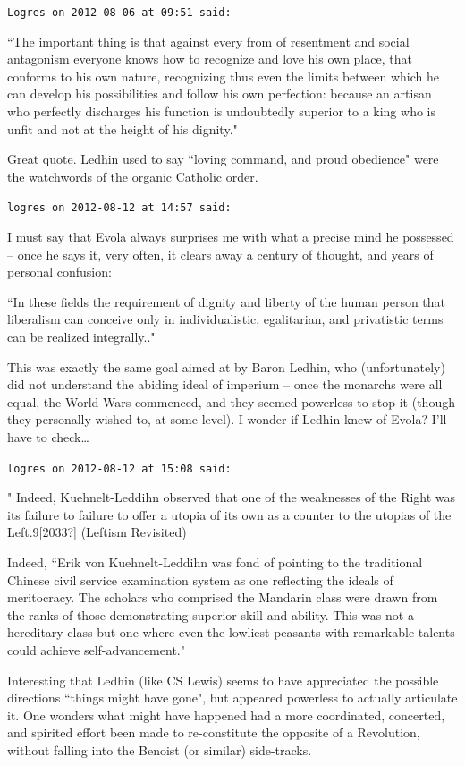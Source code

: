 \begin{footnotesize}
\begin{sffamily}
\hfill

\texttt{Logres on 2012-08-06 at 09:51 said: }

``The important thing is that against every from of resentment and social antagonism everyone knows how to recognize and love his own place, that conforms to his own nature, recognizing thus even the limits between which he can develop his possibilities and follow his own perfection: because an artisan who perfectly discharges his function is undoubtedly superior to a king who is unfit and not at the height of his dignity."

Great quote. Ledhin used to say ``loving command, and proud obedience" were the watchwords of the organic Catholic order.


\hfill

\texttt{logres on 2012-08-12 at 14:57 said: }

I must say that Evola always surprises me with what a precise mind he possessed – once he says it, very often, it clears away a century of thought, and years of personal confusion:

``In these fields the requirement of dignity and liberty of the human person that liberalism can conceive only in individualistic, egalitarian, and privatistic terms can be realized integrally.."

This was exactly the same goal aimed at by Baron Ledhin, who (unfortunately) did not understand the abiding ideal of imperium – once the monarchs were all equal, the World Wars commenced, and they seemed powerless to stop it (though they personally wished to, at some level). I wonder if Ledhin knew of Evola? I'll have to check…


\hfill

\texttt{logres on 2012-08-12 at 15:08 said: }

" Indeed, Kuehnelt-Leddihn observed that one of the weaknesses of the Right was its failure to failure to offer a utopia of its own as a counter to the utopias of the Left.9[2033?] (Leftism Revisited)

Indeed, ``Erik von Kuehnelt-Leddihn was fond of pointing to the traditional Chinese civil service examination system as one reflecting the ideals of meritocracy. The scholars who comprised the Mandarin class were drawn from the ranks of those demonstrating superior skill and ability. This was not a hereditary class but one where even the lowliest peasants with remarkable talents could achieve self-advancement."

Interesting that Ledhin (like CS Lewis) seems to have appreciated the possible directions ``things might have gone", but appeared powerless to actually articulate it. One wonders what might have happened had a more coordinated, concerted, and spirited effort been made to re-constitute the opposite of a Revolution, without falling into the Benoist (or similar) side-tracks.



\end{sffamily}
\end{footnotesize}
